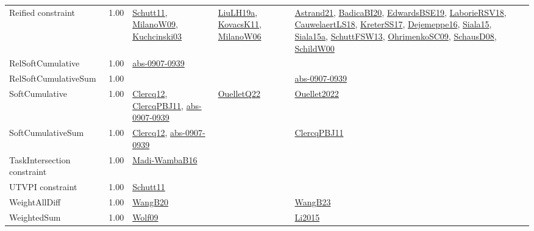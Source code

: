 {\begin{longtable}{p{3cm}r>{\raggedright\arraybackslash}p{6cm}>{\raggedright\arraybackslash}p{6cm}>{\raggedright\arraybackslash}p{8cm}}
\index{Reified constraint}\index{Constraints!Reified constraint}Reified constraint &  1.00 & \hyperref[detail:Schutt11]{Schutt11}, \hyperref[detail:MilanoW09]{MilanoW09}, \hyperref[detail:Kuchcinski03]{Kuchcinski03} & \hyperref[detail:LiuLH19a]{LiuLH19a}, \hyperref[detail:KovacsK11]{KovacsK11}, \hyperref[detail:MilanoW06]{MilanoW06} & \hyperref[detail:Astrand21]{Astrand21}, \hyperref[detail:BadicaBI20]{BadicaBI20}, \hyperref[detail:EdwardsBSE19]{EdwardsBSE19}, \hyperref[detail:LaborieRSV18]{LaborieRSV18}, \hyperref[detail:CauwelaertLS18]{CauwelaertLS18}, \hyperref[detail:KreterSS17]{KreterSS17}, \hyperref[detail:Dejemeppe16]{Dejemeppe16}, \hyperref[detail:Siala15]{Siala15}, \hyperref[detail:Siala15a]{Siala15a}, \hyperref[detail:SchuttFSW13]{SchuttFSW13}, \hyperref[detail:OhrimenkoSC09]{OhrimenkoSC09}, \hyperref[detail:SchausD08]{SchausD08}, \hyperref[detail:SchildW00]{SchildW00}\\
\index{RelSoftCumulative}\index{Constraints!RelSoftCumulative}RelSoftCumulative &  1.00 & \hyperref[detail:abs-0907-0939]{abs-0907-0939} &  & \\
\index{RelSoftCumulativeSum}\index{Constraints!RelSoftCumulativeSum}RelSoftCumulativeSum &  1.00 &  &  & \hyperref[detail:abs-0907-0939]{abs-0907-0939}\\
\index{SoftCumulative}\index{Constraints!SoftCumulative}SoftCumulative &  1.00 & \hyperref[detail:Clercq12]{Clercq12}, \hyperref[detail:ClercqPBJ11]{ClercqPBJ11}, \hyperref[detail:abs-0907-0939]{abs-0907-0939} & \hyperref[detail:OuelletQ22]{OuelletQ22} & \hyperref[detail:Ouellet2022]{Ouellet2022}\\
\index{SoftCumulativeSum}\index{Constraints!SoftCumulativeSum}SoftCumulativeSum &  1.00 & \hyperref[detail:Clercq12]{Clercq12}, \hyperref[detail:abs-0907-0939]{abs-0907-0939} &  & \hyperref[detail:ClercqPBJ11]{ClercqPBJ11}\\
\index{TaskIntersection constraint}\index{Constraints!TaskIntersection constraint}TaskIntersection constraint &  1.00 & \hyperref[detail:Madi-WambaB16]{Madi-WambaB16} &  & \\
\index{UTVPI constraint}\index{Constraints!UTVPI constraint}UTVPI constraint &  1.00 & \hyperref[detail:Schutt11]{Schutt11} &  & \\
\index{WeightAllDiff}\index{Constraints!WeightAllDiff}WeightAllDiff &  1.00 & \hyperref[detail:WangB20]{WangB20} &  & \hyperref[detail:WangB23]{WangB23}\\
\index{WeightedSum}\index{Constraints!WeightedSum}WeightedSum &  1.00 & \hyperref[detail:Wolf09]{Wolf09} &  & \hyperref[detail:Li2015]{Li2015}\\

\end{longtable}}

